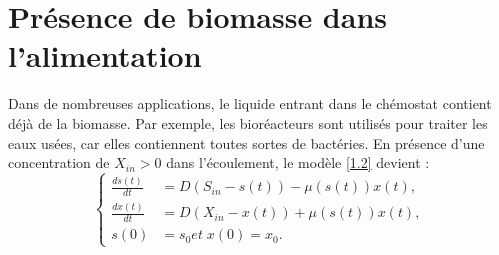 \documentclass[12pt,a4paper]{report}%
\begin{document}
\section{Présence de biomasse dans l'alimentation}
Dans de nombreuses applications, le liquide entrant dans le chémostat contient déjà de la biomasse. Par exemple, les bioréacteurs sont utilisés pour traiter les eaux usées, car elles contiennent toutes sortes de bactéries. En présence d'une concentration de $X_{in} > 0$ dans l'écoulement, le modèle \eqref{1.2} devient :
\begin{equation}\label{xin}
	\left\{\begin{aligned}
		\frac{d s(t)}{d t} & =D \left(S_{in}-s(t)\right) - \mu(s(t))x(t), \\
		\frac{d x(t)}{d t} & =D(X_{in}-x(t))+\mu(s(t)) x(t)  ,\\
		s(0)&=s_0   et\; x(0)=x_0.
	\end{aligned}\right.
\end{equation} 
\end{document}
